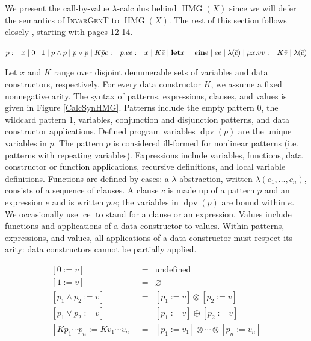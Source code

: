 \documentclass{article}
\newcommand{\assign}{:=}
\newcommand{\tmname}[1]{\textsc{#1}}
\newcommand{\tmop}[1]{\ensuremath{\operatorname{#1}}}
\newcommand{\tmstrong}[1]{\textbf{#1}}
\begin{document}
We present the call-by-value $\lambda$-calculus behind $\tmop{HMG} (X)$ since
we will defer the semantics of {\tmname{InvarGenT}} to $\tmop{HMG} (X)$. The
rest of this section follows closely {\cite{simonet-pottier-hmg-toplas}},
starting with pages 12-14.\begin{table}[t]
  $p \assign x \; | \; 0 \; | \; 1 \; | \; p \wedge p \; | \; p \vee p \; | \;
  K \bar{p}
  
  c \assign p.e
  
  e \assign x \; | \; K \bar{e} \; | \; \text{{\tmstrong{let}}} x = e
  \text{{\tmstrong{in}}} e \; | \; e e \; | \; \lambda (\bar{c}) \; | \; \mu
  x.v
  
  v \assign K \bar{v} \; | \; \lambda (\bar{c})$
  
  \label{CalcSynHMG}
  \caption{Syntax of the calculus for $\tmop{HMG} (X)$}
\end{table}

Let $x$ and $K$ range over disjoint denumerable sets of variables and data
constructors, respectively. For every data constructor $K$, we assume a fixed
nonnegative arity. The syntax of patterns, expressions, clauses, and values is
given in Figure \ref{CalcSynHMG}. Patterns include the empty pattern $0$, the
wildcard pattern $1$, variables, conjunction and disjunction patterns, and
data constructor applications. Defined program variables $\tmop{dpv} (p)$ are
the unique variables in $p$. The pattern $p$ is considered ill-formed for
nonlinear patterns (i.e. patterns with repeating variables). Expressions
include variables, functions, data constructor or function applications,
recursive definitions, and local variable definitions. Functions are defined
by cases: a $\lambda$-abstraction, written $\lambda (c_1, \ldots, c_n)$,
consists of a sequence of clauses. A clause $c$ is made up of a pattern $p$
and an expression $e$ and is written $p.e$; the variables in $\tmop{dpv} (p)$
are bound within $e$. We occasionally use $\tmop{ce}$ to stand for a clause or
an expression. Values include functions and applications of a data constructor
to values. Within patterns, expressions, and values, all applications of a
data constructor must respect its arity: data constructors cannot be partially
applied.\begin{table}[t]
  \begin{eqnarray*}
    {}[0 \assign v] & = & \text{undefined}\\
    {}[1 \assign v] & = & \varnothing\\
    {}[p_1 \wedge p_2 \assign v] & = & [p_1 \assign v] \otimes [p_2 \assign
    v]\\
    {}[p_1 \vee p_2 \assign v] & = & [p_1 \assign v] \oplus [p_2 \assign v]\\
    {}[K p_1 \cdots p_n \assign K v_1 \cdots v_n] & = & [p_1 \assign v_1]
    \otimes \cdots \otimes [p_n \assign v_n]
  \end{eqnarray*}
  \label{SubstHMG}
  \caption{Extended substitution for $\tmop{HMG} (X)$}
\end{table}
\end{document}
